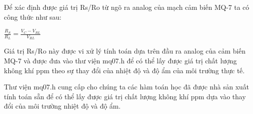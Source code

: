 Để xác định được giá trị Rs/Ro từ ngõ ra analog của mạch cảm biến MQ-7 ta có công thức như sau:
\begin{center}
$\displaystyle \frac{R_{S}}{R_{L}} = \frac{V_{C}-V_{RL}}{V_{RL}}$
\end{center}

Giá trị Rs/Ro này được vi xử lý tính toán dựa trên đầu ra analog của cảm biến MQ-7 và được đưa vào thư viện mq07.h để có thể lấy được giá trị chất lượng không khí ppm theo sự thay đổi của nhiệt độ và độ ẩm của môi trường thực tế.

Thư viện mq07.h cung cấp cho chúng ta các hàm toán học đã được nhà sản xuất tính toán sẵn để có thể lấy được giá trị chất lượng không khí ppm dựa vào thay đổi của môi trường nhiệt độ và độ ẩm.






\newpage
